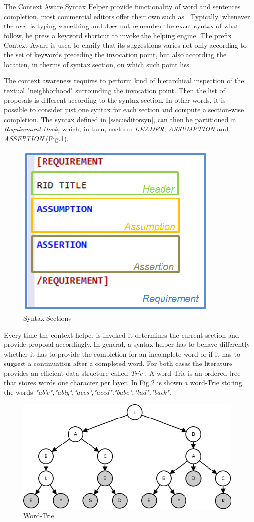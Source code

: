 The Context Aware Syntax Helper provide functionality of word and sentences completion, most commercial editors offer their own such as \citep{IntelliSense}. Typically, whenever the user is typing something and does not remember the exact syntax of what follow, he press a keyword shortcut to invoke the helping engine. The prefix Context Aware is used to clarify that its suggestions varies not only according to the set of keywords preceding the invocation point, but also according the location, in therms of syntax section, on which such point lies. 
\par The context awareness requires to perform kind of hierarchical inspection of the textual "neighborhood" surrounding the invocation point. Then the list of proposals is different according to the syntax section. In other words, it is possible to consider just one syntax for each section and compute a section-wise completion. The syntax defined in \ref{ssec:editorsyn}, can then be partitioned in \textit{Requirement block}, which, in turn, encloses \textit{HEADER}, \textit{ASSUMPTION} and \textit{ASSERTION} (Fig.\ref{fig:reqsec}).

\begin{figure}[!h]
\centering
\includegraphics[width=.4\textwidth]{Figs/resec.PNG}
\caption{Syntax Sections}
\label{fig:reqsec}
\end{figure}
Every time the context helper is invoked it determines the current section and provide proposal accordingly. In general, a syntax helper has to behave differently whether it has to provide the completion for an incomplete word or if it has to suggest a continuation after a completed word. For both cases the literature provides an efficient data structure called \textit{Trie} \citep{black2010trie}. A word-Trie is an ordered tree that stores words one character per layer. In Fig.\ref{fig:wtrie} is shown a word-Trie storing the words \textit{"able","ably","aces","aced","babe","bad","back"}.
\begin{figure}[!ht]
\centering
\includegraphics[width=.6\textwidth]{Figs/wtrie.png}
\caption{Word-Trie}
\label{fig:wtrie}
\end{figure}

